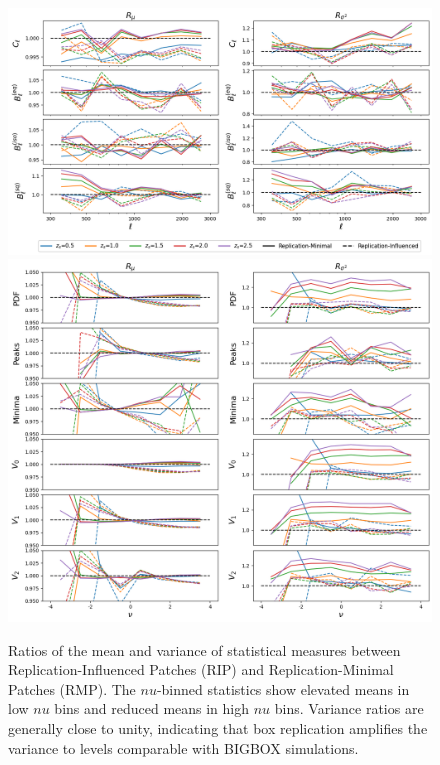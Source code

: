 \begin{figure}[p] 
    \centering 
    \includegraphics[width=\textwidth]{figures/results/BR_ratio_ell.png} 
    \includegraphics[width=\textwidth]{figures/results/BR_ratio_nu.png} 
    \caption[BIGBOX/TILED Ratios of the mean and variance of statistical measures for the RIPs and the RMPs]{Ratios of the mean and variance of statistical measures between Replication-Influenced Patches (RIP) and Replication-Minimal Patches (RMP). The $nu$-binned statistics show elevated means in low $nu$ bins and reduced means in high $nu$ bins. Variance ratios are generally close to unity, indicating that box replication amplifies the variance to levels comparable with BIGBOX simulations.} \label{fig:boxreplication_main} 
\end{figure}

